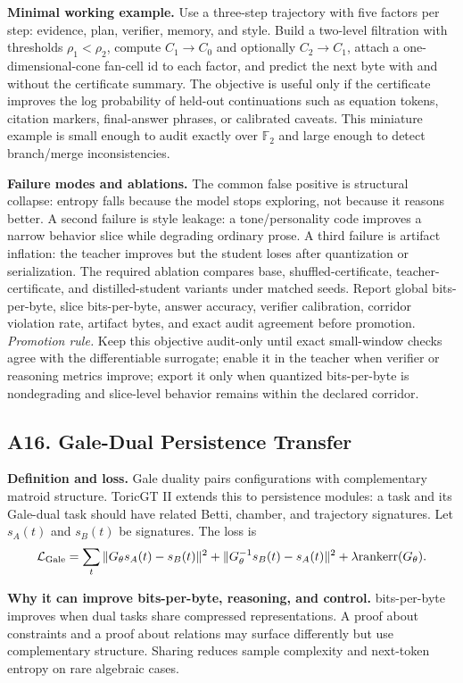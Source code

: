 \documentclass[10pt]{article}
\newcommand{\FF}{\mathbb{F}}
\newcommand{\loss}{\mathcal{L}}
\numberwithin{equation}{section}
\begin{document}
\noindent\textbf{Minimal working example.} Use a three-step trajectory with five factors per step: evidence, plan, verifier, memory, and style. Build a two-level filtration with thresholds $\rho_1<\rho_2$, compute $C_1\to C_0$ and optionally $C_2\to C_1$, attach a one-dimensional-cone fan-cell id to each factor, and predict the next byte with and without the certificate summary. The objective is useful only if the certificate improves the log probability of held-out continuations such as equation tokens, citation markers, final-answer phrases, or calibrated caveats. This miniature example is small enough to audit exactly over $\FF_2$ and large enough to detect branch/merge inconsistencies.

\noindent\textbf{Failure modes and ablations.} The common false positive is structural collapse: entropy falls because the model stops exploring, not because it reasons better. A second failure is style leakage: a tone/personality code improves a narrow behavior slice while degrading ordinary prose. A third failure is artifact inflation: the teacher improves but the student loses after quantization or serialization. The required ablation compares base, shuffled-certificate, teacher-certificate, and distilled-student variants under matched seeds. Report global bits-per-byte, slice bits-per-byte, answer accuracy, verifier calibration, corridor violation rate, artifact bytes, and exact audit agreement before promotion.
\vfill
\noindent\emph{Promotion rule.} Keep this objective audit-only until exact small-window checks agree with the differentiable surrogate; enable it in the teacher when verifier or reasoning metrics improve; export it only when quantized bits-per-byte is nondegrading and slice-level behavior remains within the declared corridor.
\clearpage
\subsection{A16. Gale-Dual Persistence Transfer}
\noindent\textbf{Definition and loss.} Gale duality pairs configurations with complementary matroid structure. ToricGT II extends this to persistence modules: a task and its Gale-dual task should have related Betti, chamber, and trajectory signatures. Let $s_A(t)$ and $s_B(t)$ be signatures. The loss is
\[
\loss_{\rm Gale}=\sum_t\|G_\theta s_A(t)-s_B(t)\|^2+\|G_\theta^{-1}s_B(t)-s_A(t)\|^2+\lambda\mathrm{rankerr}(G_\theta).
\]

\noindent\textbf{Why it can improve bits-per-byte, reasoning, and control.} bits-per-byte improves when dual tasks share compressed representations. A proof about constraints and a proof about relations may surface differently but use complementary structure. Sharing reduces sample complexity and next-token entropy on rare algebraic cases.
\end{document}
